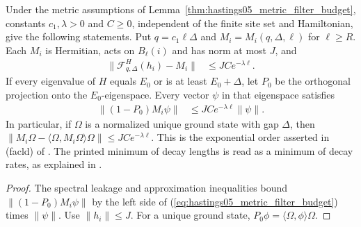 \begin{theorem}
    \label{thm:hastings05_metric_facld}
    \leanok
    Under the metric assumptions of
    Lemma~\ref{thm:hastings05_metric_filter_budget}, constants
    $c_1,\lambda>0$ and $C\ge0$, independent of the finite site set and
    Hamiltonian, give the following statements. Put $q=c_1\ell\Delta$
    and $M_i=M_i(q,\Delta,\ell)$ for $\ell\ge R$.
    Each $M_i$ is Hermitian, acts on $B_\ell(i)$ and has norm at most $J$,
    and
    \begin{align}
        \|\mathcal F_{q,\Delta}^{H}(h_i)-M_i\| & \le JC e^{-\lambda\ell}.
        \label{eq:hastings05_metric_filter_error}
    \end{align}
    If every eigenvalue of $H$ equals $E_0$ or is at least $E_0+\Delta$,
    let $P_0$ be the orthogonal projection onto the $E_0$-eigenspace.
    Every vector $\psi$ in that eigenspace satisfies
    \begin{align}
        \|(1-P_0)M_i\psi\| & \le JC e^{-\lambda\ell}\|\psi\|.
        \label{eq:hastings05_metric_facld}
    \end{align}
    In particular, if $\Omega$ is a normalized unique ground state with
    gap $\Delta$, then
    $\|M_i\Omega-\langle\Omega,M_i\Omega\rangle\Omega\|
        \le JC e^{-\lambda\ell}$.
    This is the exponential order asserted in (facld) of
    \cite[lines 322--348]{Hastings2006Solving}. The printed minimum of
    decay lengths is read as a minimum of decay rates, as explained in
    \cite{gap:hastings05_truncated_dynamics}.
\end{theorem}
\begin{proof}\leanok
    The spectral leakage and approximation inequalities bound
    $\|(1-P_0)M_i\psi\|$ by the left side of
    (\ref{eq:hastings05_metric_filter_budget}) times $\|\psi\|$.
    Use $\|h_i\|\le J$. For a unique ground state,
    $P_0\phi=\langle\Omega,\phi\rangle\Omega$.
\end{proof}

